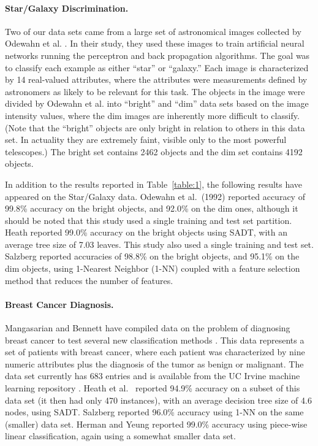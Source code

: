 \paragraph{Star/Galaxy Discrimination.}
Two of our data sets came from a large set of astronomical images
collected by Odewahn et al. \cite{odewahn/etal/92}.  In their study,
they used these images to train artificial neural networks running the
perceptron and back propagation algorithms.  The goal was to
classify each example as either ``star'' or ``galaxy.''  Each image is
characterized by 14 real-valued attributes, where the attributes were
measurements defined by astronomers as likely to be relevant for this
task.  The objects in the image were divided by Odewahn et al. into
``bright'' and ``dim'' data sets based on the image intensity values,
where the dim images are inherently more difficult to classify.  (Note
that the ``bright'' objects are only bright in relation to others in
this data set.  In actuality they are extremely faint, visible only to
the most powerful telescopes.)  The bright set contains 2462 objects
and the dim set contains 4192 objects.

In addition to the results reported in Table~\ref{table:1}, the
following results have appeared on the Star/Galaxy data.  Odewahn et
al.~(1992) reported accuracy of 99.8\% accuracy on the bright objects,
and 92.0\% on the dim ones, although it should be noted that this
study used a single training and test set partition.  Heath
\citeyear{heath/92} reported 99.0\% accuracy on the bright objects using
SADT, with an average tree size of 7.03 leaves.  This study also used
a single training and test set.  Salzberg \citeyear{salzberg/92} reported
accuracies of 98.8\% on the bright objects, and 95.1\% on the dim
objects, using 1-Nearest Neighbor (1-NN) coupled with a feature
selection method that reduces the number of features.

\paragraph{Breast Cancer Diagnosis.} 
Mangasarian and Bennett have compiled data on the problem of
diagnosing breast cancer to test several new classification methods
\cite{mangasarian/etal/90,bennett/mangasarian/92,bennett/mangasarian/94a}.
This data represents a set of patients with breast cancer, where each
patient was characterized by nine numeric attributes plus the
diagnosis of the tumor as benign or malignant.  The data set currently
has 683 entries and is available from the UC Irvine machine learning
repository \cite{mlrepository}.  Heath et al.~\citeyear{heath/etal/93}
reported 94.9\% accuracy on a subset of this data set (it then had
only 470 instances), with an average decision tree size of 4.6 nodes,
using SADT\@.  Salzberg \citeyear{salzberg/91} reported 96.0\%
accuracy using 1-NN on the same (smaller) data set. Herman and Yeung
\citeyear{herman/yeung/92} reported 99.0\% accuracy using piece-wise
linear classification, again using a somewhat smaller data set.

